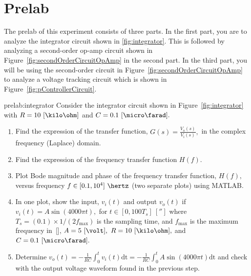 \section{Prelab}
\label{sec:prelab}

The prelab of this experiment  consists of three parts. In the first part, you are to analyze the integrator circuit shown in \autoref{fig:integrator}. This is followed by analyzing a second-order op-amp circuit shown in Figure~\ref{fig:secondOrderCircuitOpAmp} in the second part. In the third part, you will be using the second-order circuit in Figure~\ref{fig:secondOrderCircuitOpAmp} to analyze a voltage tracking circuit which is  shown in Figure~\ref{fig:pControllerCircuit}.

%
\begin{prelab}{prelab:integrator}
Consider the integrator circuit shown in Figure~\ref{fig:integrator} with $R =  10~[\kilo\ohm]$  and $C= 0.1~[\micro\farad].$   

\begin{enumerate}
\item Find the  expression of the transfer function, $G(s) = \frac{V_{\mathrm{o}}(s)}{V_{\mathrm{i}}(s)},$ in the complex frequency (Laplace) domain.
  
\item Find the expression of the frequency transfer function $H(f).$
  
\item Plot Bode magnitude and phase of the frequency transfer function, $H(f),$ versus frequency $f\in[0.1,10^4]~\hertz$ (two separate plots) using MATLAB. 


\item In one plot, show the input, $v_i(t)$ and output $v_o(t)$ if $v_i(t) = A\sin(4000\pi t),$ for $t\in[0, 100T_s]~[\second]$ where  $T_s = (0.1)\times 1/(2f_{\mathrm{max}})$ is the sampling time, and $f_{\mathrm{max}}$ is the maximum frequency in~[\hertz], $A = 5~[\volt],$ $R=10~[\kilo\ohm],$ and $C = 0.1~[\micro\farad].$

\item Determine $v_o(t) = -\frac{1}{RC}\int_0^tv_i(t)\mathrm{dt} = -\frac{1}{RC}\int_0^t A\sin(4000\pi t)\mathrm{dt}$ and check with the output voltage waveform found in the previous step.   
\end{enumerate}
\end{prelab}


